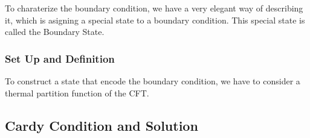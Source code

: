 To charaterize the boundary condition, we have a very elegant way of describing it, which is asigning a special state to a boundary condition. This special state is called the Boundary State.

\subsubsection{Set Up and Definition}

To construct a state that encode the boundary condition, we have to consider a thermal partition function of the CFT.


\subsection{Cardy Condition and Solution}





